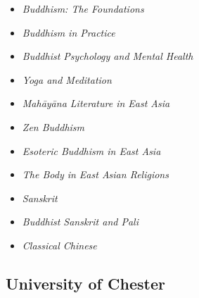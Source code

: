 \documentclass[a4paper,10.5pt]{article}
\begin{document}
\begin{enumerate}
\label{sec:org07e0b09}
\begin{itemize}
\item \emph{Buddhism: The Foundations}\\
\item \emph{Buddhism in Practice}\\
\item \emph{Buddhist Psychology and Mental Health}\\
\item \emph{Yoga and Meditation}\\
\item \emph{Mahāyāna Literature in East Asia}\\
\item \emph{Zen Buddhism}\\
\item \emph{Esoteric Buddhism in East Asia}\\
\item \emph{The Body in East Asian Religions}\\
\item \emph{Sanskrit}\\
\item \emph{Buddhist Sanskrit and Pali}\\
\item \emph{Classical Chinese}\\
\end{itemize}
\end{enumerate}

\subsection{University of Chester}
\label{sec:org21987bd}
\end{document}
